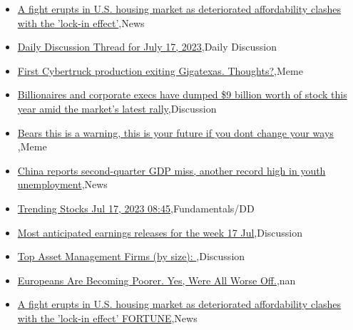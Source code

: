 \documentclass{article}%
\begin{document}
%
\begin{itemize}%
\item%
\href{https://reddit.com/r/wallstreetbets/comments/151yvuj/a\_fight\_erupts\_in\_us\_housing\_market\_as/}{A fight erupts in U.S. housing market as deteriorated affordability clashes with the 'lock-in effect'},News%
\item%
\href{https://reddit.com/r/wallstreetbets/comments/151xl53/daily\_discussion\_thread\_for\_july\_17\_2023/}{Daily Discussion Thread for July 17, 2023},Daily Discussion%
\item%
\href{https://reddit.com/r/wallstreetbets/comments/151stkk/first\_cybertruck\_production\_exiting\_gigatexas/}{First Cybertruck production exiting Gigatexas. Thoughts?},Meme%
\item%
\href{https://reddit.com/r/wallstreetbets/comments/151rufk/billionaires\_and\_corporate\_execs\_have\_dumped\_9/}{Billionaires and corporate execs have dumped \$9 billion worth of stock this year amid the market's latest rally},Discussion%
\item%
\href{https://reddit.com/r/wallstreetbets/comments/151rlcn/bears\_this\_is\_a\_warning\_this\_is\_your\_future\_if/}{Bears this is a warning, this is your future if you dont change your ways },Meme%
\item%
\href{https://reddit.com/r/wallstreetbets/comments/151rldj/china\_reports\_secondquarter\_gdp\_miss\_another/}{China reports second-quarter GDP miss, another record high in youth unemployment},News%
\item%
\href{https://reddit.com/r/StockMarket/comments/1520zvh/trending\_stocks\_jul\_17\_2023\_0845/}{Trending Stocks Jul 17, 2023 08:45},Fundamentals/DD%
\item%
\href{https://reddit.com/r/StockMarket/comments/151yjjv/most\_anticipated\_earnings\_releases\_for\_the\_week/}{Most anticipated earnings releases for the week 17 Jul},Discussion%
\item%
\href{https://reddit.com/r/StockMarket/comments/151u58l/top\_asset\_management\_firms\_by\_size/}{Top Asset Management Firms (by size): },Discussion%
\item%
\href{https://reddit.com/r/Economics/comments/151r84x/europeans\_are\_becoming\_poorer\_yes\_were\_all\_worse/}{Europeans Are Becoming Poorer. Yes, Were All Worse Off.},nan%
\item%
\href{https://reddit.com/r/Economics/comments/151m0z1/a\_fight\_erupts\_in\_us\_housing\_market\_as/}{A fight erupts in U.S. housing market as deteriorated affordability clashes with the 'lock-in effect'  FORTUNE},News%
\end{itemize}%
\end{document}
